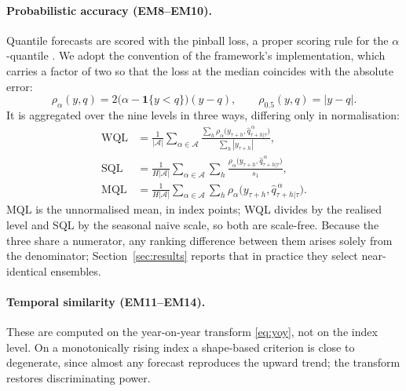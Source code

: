\documentclass[12pt]{article}
\begin{document}
\paragraph{Probabilistic accuracy (EM8--EM10).}
Quantile forecasts are scored with the pinball loss, a proper scoring rule for
the $\alpha$-quantile \citep{gneiting2007}. We adopt the convention of the
framework's implementation, which carries a factor of two so that the loss at
the median coincides with the absolute error:
\begin{equation}
    \rho_\alpha(y, q) = 2\big(\alpha - \mathbf{1}\{y < q\}\big)(y - q),
    \qquad \rho_{0.5}(y,q) = |y - q| .
\end{equation}
It is aggregated over the nine levels in three ways, differing only in
normalisation:
\begin{align}
    \text{WQL} &= \frac{1}{|\mathcal{A}|} \sum_{\alpha \in \mathcal{A}}
        \frac{\sum_{h} \rho_\alpha\big(y_{\tau+h}, \hat{q}^{\,\alpha}_{\tau+h|\tau}\big)}
             {\sum_{h} |y_{\tau+h}|}, \\
    \text{SQL} &= \frac{1}{H|\mathcal{A}|} \sum_{\alpha \in \mathcal{A}} \sum_{h}
        \frac{\rho_\alpha\big(y_{\tau+h}, \hat{q}^{\,\alpha}_{\tau+h|\tau}\big)}{s_1}, \\
    \text{MQL} &= \frac{1}{H|\mathcal{A}|} \sum_{\alpha \in \mathcal{A}} \sum_{h}
        \rho_\alpha\big(y_{\tau+h}, \hat{q}^{\,\alpha}_{\tau+h|\tau}\big).
\end{align}
MQL is the unnormalised mean, in index points; WQL divides by the realised level
and SQL by the seasonal naive scale, so both are scale-free. Because the three
share a numerator, any ranking difference between them arises solely from the
denominator; Section~\ref{sec:results} reports that in practice they select
near-identical ensembles.

\paragraph{Temporal similarity (EM11--EM14).}
These are computed on the year-on-year transform \eqref{eq:yoy}, not on the index
level. On a monotonically rising index a shape-based criterion is close to
degenerate, since almost any forecast reproduces the upward trend; the transform
restores discriminating power.
\end{document}
